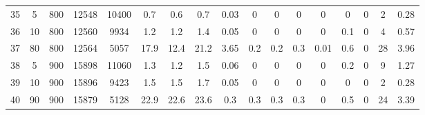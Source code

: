 \documentclass[11pt]{article}
\begin{document}
\begin{landscape}
\begin{longtable}[c]{ccccc|cccc|cccc|cccc}
		35 & 5 & 800 & 12548 & 10400 & 0.7 & 0.6 & 0.7 & 0.03 & 0 & 0 & 0 & 0 & 0 & 0 & 2 & 0.28 \\
		36 & 10 & 800 & 12560 & 9934 & 1.2 & 1.2 & 1.4 & 0.05 & 0 & 0 & 0 & 0 & 0.1 & 0 & 4 & 0.57 \\
		37 & 80 & 800 & 12564 & 5057 & 17.9 & 12.4 & 21.2 & 3.65 & 0.2 & 0.2 & 0.3 & 0.01 & 0.6 & 0 & 28 & 3.96 \\
		\rowcolor[HTML]{EFEFEF} 
		38 & 5 & 900 & 15898 & 11060 & 1.3 & 1.2 & 1.5 & 0.06 & 0 & 0 & 0 & 0 & 0.2 & 0 & 9 & 1.27 \\
		\rowcolor[HTML]{EFEFEF} 
		39 & 10 & 900 & 15896 & 9423 & 1.5 & 1.5 & 1.7 & 0.05 & 0 & 0 & 0 & 0 & 0 & 0 & 2 & 0.28 \\
		\rowcolor[HTML]{EFEFEF} 
		40 & 90 & 900 & 15879 & 5128 & 22.9 & 22.6 & 23.6 & 0.3 & 0.3 & 0.3 & 0.3 & 0 & 0.5 & 0 & 24 & 3.39
	\end{longtable}
\end{landscape}
\end{document}

